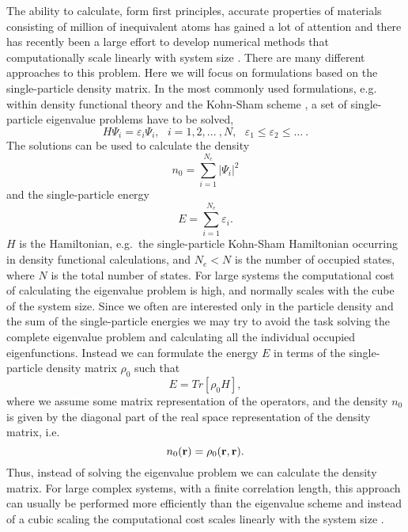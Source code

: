 The ability to calculate, form first principles, accurate properties of materials
consisting of million of inequivalent atoms has gained a lot of attention
and there has recently been a large effort to develop numerical methods that computationally 
scale linearly with system size \cite{Goedecker_RMP_99}. There are many different
approaches to this problem. Here we will focus on formulations
based on the single-particle density matrix. 
In the most commonly used formulations, e.g. within density functional theory
and the Kohn-Sham scheme \cite{Hohenberg64,Kohn65}, a set of single-particle
eigenvalue problems have to be solved,
\begin{equation}\label{SE}
H \Psi_i = \varepsilon_i \Psi_i, ~~~ i=1,2,...~,N, ~~~ \varepsilon_1 \leq \varepsilon_2 \leq \ldots ~.
\end{equation}
The solutions can be used to calculate the density
\begin{equation}\label{Density}
n_0 = \sum_{i=1}^{N_e} | \Psi_i |^2
\end{equation}
and the single-particle energy
\begin{equation} \label{Energy}
E = \sum_{i=1}^{N_e} \varepsilon_i.
\end{equation}
$H$ is the Hamiltonian, e.g.\ the single-particle Kohn-Sham Hamiltonian
occurring in density functional calculations,
and $N_e < N$ is the number of occupied states, where $N$ is the total number
of states. For large systems the computational
cost of calculating the eigenvalue problem is high, and normally scales 
with the cube of the system size. Since we often
are interested only in the particle density and the sum of the single-particle energies 
we may try to avoid the task solving the complete eigenvalue problem and
calculating all the individual occupied eigenfunctions. Instead we can formulate 
the energy $E$ in terms of the single-particle density matrix $\rho_0$ such that 
\begin{equation}
\label{E_Trace}
E = Tr[ \rho_0 H ],
\end{equation}
where we assume some matrix representation of the operators,
and the density $n_0$ is given by the diagonal part of the real space representation
of the density matrix, i.e.
\begin{equation}
\label{n_Diag} 
n_0({\bf r}) = \rho_0({\bf r},{\bf r}).
\end{equation}
Thus, instead of solving the eigenvalue problem we can calculate
the density matrix. For large complex systems, with a finite correlation 
length, this approach can usually be performed more efficiently than 
the eigenvalue scheme and instead of a cubic scaling the computational 
cost scales linearly with the system size \cite{Goedecker_RMP_99}.

